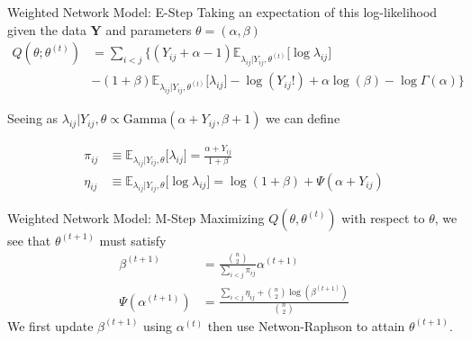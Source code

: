 \documentclass[handout]{beamer}
\begin{document}
\begin{frame}{Weighted Network Model: E-Step}
Taking an expectation of this log-likelihood given the data $\mathbf{Y}$ and parameters $\theta = (\alpha, \beta)$ 
\begin{align*}
Q(\theta; \theta^{(t)})  &= \sum_{i<j}\Big\{ (Y_{ij}+ \alpha - 1)\mathbb{E}_{\lambda_{ij}|Y_{ij}, \theta^{(t)}} \big[\log \lambda_{ij}\big] \\
    &- (1+ \beta)\mathbb{E}_{\lambda_{ij}|Y_{ij}, \theta^{(t)}}\big[\lambda_{ij}\big] -\log(Y_{ij}!) + \alpha \log(\beta) - \log \Gamma(\alpha)\Big\}
\end{align*}\pause

Seeing as $\lambda_{ij}|Y_{ij}, \theta \propto \text{Gamma}(\alpha + Y_{ij}, \beta + 1)$  we can define 

\begin{align*}
\pi_{ij} &\equiv \mathbb{E}_{\lambda_{ij}|Y_{ij}, \theta}\big[\lambda_{ij} \big] = \frac{\alpha + Y_{ij}}{1+ \beta} \\
\eta_{ij} &\equiv \mathbb{E}_{\lambda_{ij}|Y_{ij}, \theta}\big[\log \lambda_{ij} \big] = \log(1 + \beta) + \Psi (\alpha + Y_{ij})
\end{align*}

\end{frame}

\begin{frame}{Weighted Network Model: M-Step}
Maximizing $Q(\theta, \theta^{(t)})$ with respect to $\theta$, we see that $\theta^{(t+1)}$ must satisfy 
\begin{align*}
\beta^{(t+1)} &= \frac{\binom{n}{2}}{\sum_{i<j}\pi_{ij}}\alpha^{(t+1)}\\
\Psi(\alpha^{(t+1)}) &= \frac{\sum_{i<j} \eta_{ij} + \binom{n}{2} \log(\beta^{(t+1)})}{\binom{n}{2}} 
\end{align*}
We first update $\beta^{(t+1)}$ using $\alpha^{(t)}$ then use Netwon-Raphson to attain $\theta^{(t+1)}$. 
\end{frame}
\end{document}
